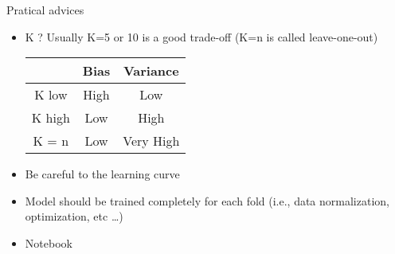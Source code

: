 \begin{frame}{Pratical advices}
  \begin{itemize}
  \item K ? Usually K=5 or 10 is a good trade-off (K=n is called leave-one-out)
    \begin{center}
      \begin{tabular}{ccc}
        \toprule
        &Bias & Variance \\
        \midrule
        K low & High & Low \\
        K high & Low & High \\
        \midrule
        K = n & Low & Very High \\
        \bottomrule
      \end{tabular}
    \end{center}
  \item Be careful to the learning curve
    \begin{center}
    \end{center}
  \item Model should be trained completely for each fold (i.e., data normalization, optimization, etc \ldots)
  \item \alert{Notebook}
  \end{itemize}  
\end{frame}
